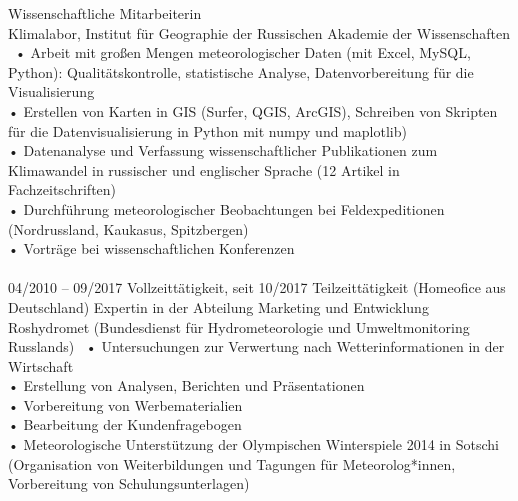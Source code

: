 \documentclass[11pt]{developercv} %
\begin{document}


\begin{entrylist}
    {Wissenschaftliche Mitarbeiterin\\}
    {Klimalabor, Institut für Geographie der Russischen Akademie der Wissenschaften}
    {\
      • Arbeit mit großen Mengen meteorologischer Daten (mit Excel, MySQL, Python): Qualitätskontrolle, statistische Analyse, Datenvorbereitung für die Visualisierung\\
      • Erstellen von Karten in GIS (Surfer, QGIS, ArcGIS), Schreiben von Skripten für die Datenvisualisierung in Python mit numpy und maplotlib)\\
      • Datenanalyse und Verfassung wissenschaftlicher Publikationen zum Klimawandel in russischer und englischer Sprache (12 Artikel in Fachzeitschriften)\\
      • Durchführung meteorologischer Beobachtungen bei Feldexpeditionen (Nordrussland, Kaukasus, Spitzbergen)\\
      • Vorträge bei wissenschaftlichen Konferenzen\\\\
      {\footnotesize* 04/2010 – 09/2017 Vollzeittätigkeit, seit 10/2017 Teilzeittätigkeit (Homeofice aus Deutschland)}
    }
    {Expertin in der Abteilung Marketing und Entwicklung\\}
    {Roshydromet (Bundesdienst für Hydrometeorologie und Umweltmonitoring Russlands)}
    {\
      • Untersuchungen zur Verwertung nach Wetterinformationen in der Wirtschaft\\
      • Erstellung von Analysen, Berichten und Präsentationen\\
      • Vorbereitung von Werbematerialien\\
      • Bearbeitung der Kundenfragebogen\\
      • Meteorologische Unterstützung der Olympischen Winterspiele 2014 in Sotschi (Organisation von Weiterbildungen und Tagungen für Meteorolog*innen, Vorbereitung von Schulungsunterlagen)\\
    }
\end{entrylist}


\end{document}
